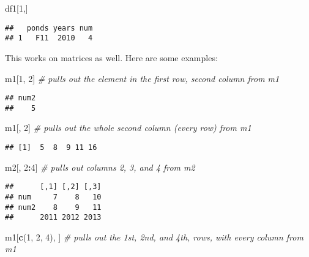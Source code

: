 \documentclass[]{book}
\newenvironment{Shaded}{\begin{snugshade}}{\end{snugshade}}
\newcommand{\KeywordTok}[1]{\textcolor[rgb]{0.13,0.29,0.53}{\textbf{#1}}}
\newcommand{\DecValTok}[1]{\textcolor[rgb]{0.00,0.00,0.81}{#1}}
\newcommand{\CommentTok}[1]{\textcolor[rgb]{0.56,0.35,0.01}{\textit{#1}}}
\newcommand{\OperatorTok}[1]{\textcolor[rgb]{0.81,0.36,0.00}{\textbf{#1}}}
\newcommand{\NormalTok}[1]{#1}
\theoremstyle{definition}
\theoremstyle{definition}
\theoremstyle{definition}
\theoremstyle{remark}
\begin{document}
\begin{Shaded}
\begin{Highlighting}[]
\NormalTok{df1[}\DecValTok{1}\NormalTok{,]}
\end{Highlighting}
\end{Shaded}

\begin{verbatim}
##   ponds years num
## 1   F11  2010   4
\end{verbatim}

This works on matrices as well. Here are some examples:

\begin{Shaded}
\begin{Highlighting}[]
\NormalTok{m1[}\DecValTok{1}\NormalTok{, }\DecValTok{2}\NormalTok{]          }\CommentTok{# pulls out the element in the first row, second column from m1}
\end{Highlighting}
\end{Shaded}

\begin{verbatim}
## num2 
##    5
\end{verbatim}

\begin{Shaded}
\begin{Highlighting}[]
\NormalTok{m1[, }\DecValTok{2}\NormalTok{]           }\CommentTok{# pulls out the whole second column (every row) from m1}
\end{Highlighting}
\end{Shaded}

\begin{verbatim}
## [1]  5  8  9 11 16
\end{verbatim}

\begin{Shaded}
\begin{Highlighting}[]
\NormalTok{m2[, }\DecValTok{2}\OperatorTok{:}\DecValTok{4}\NormalTok{]         }\CommentTok{# pulls out columns 2, 3, and 4 from m2}
\end{Highlighting}
\end{Shaded}

\begin{verbatim}
##      [,1] [,2] [,3]
## num     7    8   10
## num2    8    9   11
##      2011 2012 2013
\end{verbatim}

\begin{Shaded}
\begin{Highlighting}[]
\NormalTok{m1[}\KeywordTok{c}\NormalTok{(}\DecValTok{1}\NormalTok{, }\DecValTok{2}\NormalTok{, }\DecValTok{4}\NormalTok{), ]  }\CommentTok{# pulls out the 1st, 2nd, and 4th, rows, with every column from m1}
\end{Highlighting}
\end{Shaded}
\end{document}
